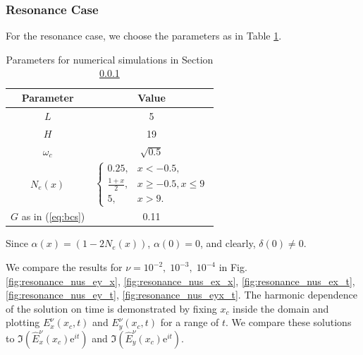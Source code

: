 \subsubsection{Resonance Case}
\label{sec:resn}
For the resonance case, we choose the parameters as in Table \ref{tab:parameters_resonance}.
\begin{table}[htb!]
\begin{tabular}{c|c}
Parameter & Value \\
\hline
$L$ & 5\\
$H$ & 19\\
$\omega_c$ &  $\sqrt{0.5}$\\
$N_e(x)$ &  $\left\{
 \begin{array}{cc}
  0.25, & x<-0.5,\\
  \frac{1+x}{2}, & x\geq -0.5, x\leq 9\\
  5, & x>9.
 \end{array}\right.$\\
 $G$ as in (\ref{eq:bcs}) & 0.11 \\
\end{tabular}
\caption{Parameters for numerical simulations in Section \ref{sec:resn}}
\label{tab:parameters_resonance}
\end{table}
Since $\alpha(x)=(1-2N_e(x))$, $\alpha(0)=0$, and clearly, $\delta(0)\neq 0$.

We compare the results for $\nu=10^{-2},\; 10^{-3},\; 10^{-4}$ in Fig. \ref{fig:resonance_nus_ey_x}, 
\ref{fig:resonance_nus_ex_x}, \ref{fig:resonance_nus_ex_t}, \ref{fig:resonance_nus_ey_t}, \ref{fig:resonance_nus_eyx_t}. 
The harmonic dependence of the solution on time is demonstrated by fixing $x_c$ inside the domain and plotting 
$E_x^{\nu}(x_c,t)$ and $E_y^{\nu}(x_c, t)$ for a range of $t$. We compare these solutions to $\Im\left(\hat{E}_x^{\nu}(x_c)\mathrm{e}^{it}\right)$ and 
$\Im\left(\hat{E}_y^{\nu}(x_c)\mathrm{e}^{it}\right)$.  

